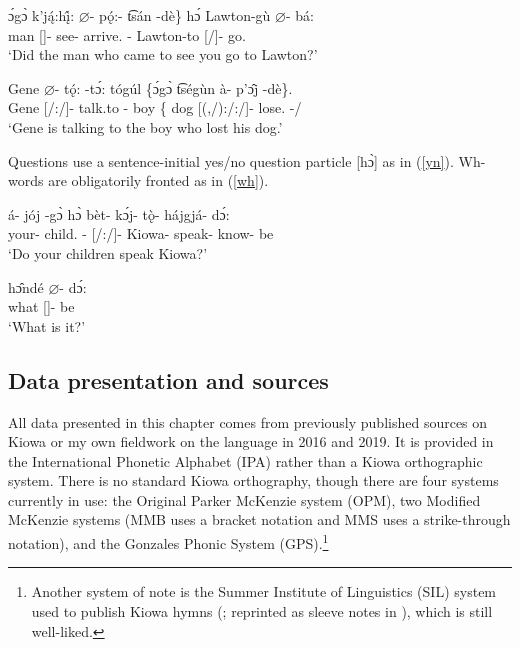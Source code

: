 \documentclass[output=paper]{langscibook}
\begin{document}
\ea \label{RCleft}
\gll {\{}\'{ɔ}g\`{ɔ} k'j\k{á}:h\k{î}: {$\varnothing$}- p\k{ó}:- t͡sán -dè{\}} h\'{ɔ} Lawton-g\`u {$\varnothing$}- bá: \\
{\Sub} man [\Third\Sg]- see- {arrive.\Pfv} -{\Nom} {\Q} Lawton-to [\Third/\Sg]- {go.\Pfv}\\
\trans `Did the man who came to see you go to Lawton?' \citep[][212]{Watkins:1984} %
\z 

\ea \label{lefthead}
\gll Gene {$\varnothing$}- t\k{ó}: -t\'{ɔ}: tógúl {\{}\'{ɔ}g\`{ɔ} t͡ség\`un \`a- p'\^{ɔ}j -dè{\}}. \\
Gene [\Third\Sg/\Aarg:\Sg/\Obj]- talk.to -{\Ipfv} boy  {\{}{\Sub} dog [(\Second,\Third\Sg/\Aarg):\Third\Sg/\Parg:\Sg/\Obj]- lose.{\Pfv} -{\Nom}/{\Bas} \\
\trans `Gene is talking to the boy who lost his dog.' \citep[][234]{Watkins:1984}
\z

Questions use a sentence-initial yes/no question particle [h\`{ɔ}] as in (\ref{yn}). Wh-words are obligatorily fronted as in (\ref{wh}).

\ea \label{yn}
\gll á- jój -g\`{ɔ} h\`{ɔ} bèt- k\'{ɔ}j- t\k{ò}- hájgjá- d\'{ɔ}:\\
your- child.{\Inv} -{\Inv} {\Q} [\Second\Pl/\Aarg:\Pl/\Obj]- Kiowa- speak- know- be\\
\trans `Do your children speak Kiowa?' \citep[][48]{Miller:2018}
\z

\ea \label{wh}
\gll h\^{ɔ}ndé $\varnothing$- d\'{ɔ}:\\
what [\Third\Sg]- be \\
\trans `What is it?' \citep[][48]{Miller:2018}
\z

\subsection{Data presentation and sources} \label{sec:data}

All data presented in this chapter comes from previously published sources on Kiowa or my own fieldwork on the language in 2016 and 2019. It is provided in the International Phonetic Alphabet (IPA) rather than a Kiowa orthographic system. There is no standard Kiowa orthography, though there are four systems currently in use: the Original Parker McKenzie system (OPM), two Modified McKenzie systems (MMB uses a bracket notation and MMS uses a strike-through notation), and the Gonzales Phonic System (GPS).\footnote{Another system of note is the Summer Institute of Linguistics (SIL) system used to publish Kiowa hymns (\citealt{gibson:1962}; reprinted as sleeve notes in \citealt{kotay:2005}), which is still well-liked.} 
\end{document}
